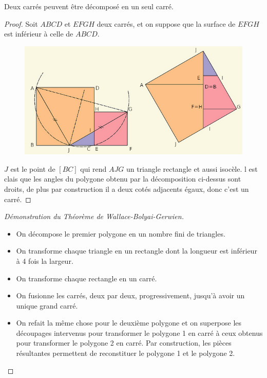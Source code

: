 \begin{li}
  Deux carrés peuvent être décomposé en un seul carré.
\end{li}
\begin{proof}
  \hfill

  \noindent
  Soit $ABCD$ et $EFGH$ deux carrés, et on suppose que la surface de $EFGH$ est inférieur à celle de $ABCD$.
  \newpage
  \begin{figure}[h]
      \centering
      \includegraphics[scale=0.6]{images/xx4.png}

  \end{figure}

\noindent
$J$ est le point de $[BC]$ qui rend $AJG$ un triangle rectangle et aussi isocèle. l est clais que les angles du polygone obtenu par la décomposition ci-dessus sont droits, de plus par construction il a deux cotés adjacents égaux, donc c'est un carré.
\end{proof}
\begin{proof}[Démonstration du Théorème de Wallace-Bolyai-Gerwien]
  \hfill
  \begin{itemize}
    \item On décompose le premier polygone en un nombre fini de triangles.
    \item On transforme chaque triangle en un rectangle dont la longueur est inférieur à 4 fois la largeur.
    \item On transforme chaque rectangle en un carré.
    \item On fusionne les carrés, deux par deux, progressivement, jusqu'à avoir un unique grand carré.
    \item On refait la même chose pour le deuxième polygone et on superpose les découpages intervenus pour transformer le polygone 1 en carré à ceux obtenus pour transformer le polygone 2 en carré. Par construction, les pièces résultantes permettent de reconstituer le polygone 1 et le polygone 2.


  \end{itemize}
\end{proof}

